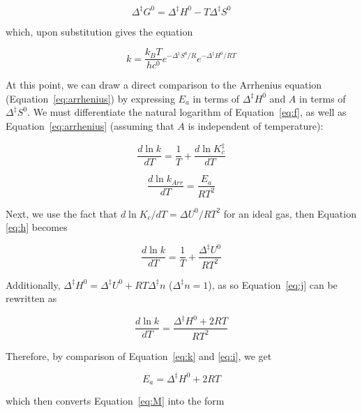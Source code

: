 \begin{equation}
  \Delta^\ddagger G^0 = \Delta^\ddagger H^0 - T \Delta^\ddagger S^0
\end{equation}

\noindent which, upon substitution gives the equation

\begin{equation}
  k = \frac{k_B T}{hc^0} e^{-\Delta^\ddagger S^0/R} e^{-\Delta^\ddagger H^0/RT}
\label{eq:M}
\end{equation}

At this point, we can draw a direct comparison to the Arrhenius equation
(Equation~\ref{eq:arrhenius}) by expressing $E_a$ in terms of $\Delta^\ddagger
H^0$ and $A$ in terms of $\Delta^\ddagger S^0$.  We must differentiate the
natural logarithm of Equation~\ref{eq:f}, as well as
Equation~\ref{eq:arrhenius} (assuming that $A$ is independent of temperature):

\begin{equation}
  \frac{d \ln k}{dT} = \frac{1}{T} + \frac{d \ln K_c^\ddagger}{dT}
  \label{eq:h}
\end{equation}

\begin{equation}
  \frac{d \ln k_{Arr}}{dT} = \frac{E_a}{RT^2}
  \label{eq:i}
\end{equation}

\noindent Next, we use the fact that $d \ln K_c / dT = \Delta U^0/RT^2$ for an
ideal gas, then Equation \ref{eq:h}  becomes

\begin{equation}
  \frac{d \ln k}{dT} = \frac{1}{T} + \frac{\Delta ^\ddagger U^0}{RT^2}
  \label{eq:j}
\end{equation}

\noindent Additionally, $\Delta ^\ddagger H^0 = \Delta ^\ddagger U^0 + RT
\Delta^\ddagger n$ ($\Delta^\ddagger n = 1$), as so Equation~\ref{eq:j} can be
rewritten as

\begin{equation}
  \frac{d \ln k}{dT} = \frac{\Delta ^\ddagger H^0 + 2RT}{RT^2}
  \label{eq:k}
\end{equation}

\noindent Therefore, by comparison of Equation~\ref{eq:k} and \ref{eq:i}, we
get

\begin{equation}
  E_a = \Delta^\ddagger H^0 + 2RT
  \label{eq:Ea-vs-dH}
\end{equation}

\noindent which then converts Equation~\ref{eq:M} into the form

